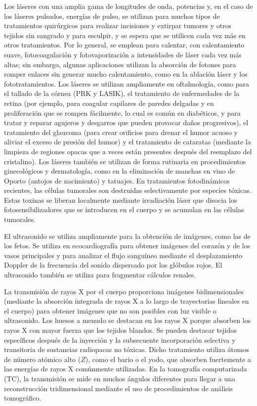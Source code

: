 \documentclass[12pt,a4paper]{book}
\begin{document}
Los láseres con una amplia gama de longitudes de onda, potencias y, en el caso de los láseres pulsados, energías de pulso, se utilizan para muchos tipos de tratamientos quirúrgicos para realizar incisiones y extirpar tumores y otros tejidos sin sangrado y para esculpir, y se espera que se utilicen cada vez más en otros tratamientos. Por lo general, se emplean para calentar, con calentamiento suave, fotocoagulación y fotovaporización a intensidades de láser cada vez más altas; sin embargo, algunas aplicaciones utilizan la absorción de fotones para romper enlaces sin generar mucho calentamiento, como en la ablación láser y los fototratamientos. Los láseres se utilizan ampliamente en oftalmología, como para el tallado de la córnea (PRK y LASIK), el tratamiento de enfermedades de la retina (por ejemplo, para coagular capilares de paredes delgadas y en proliferación que se rompen fácilmente, lo cual es común en diabéticos, y para tratar y reparar agujeros y desgarros que pueden provocar daños progresivos), el tratamiento del glaucoma (para crear orificios para drenar el humor acuoso y aliviar el exceso de presión del humor) y el tratamiento de cataratas (mediante la limpieza de regiones opacas que a veces están presentes después del reemplazo del cristalino). Los láseres también se utilizan de forma rutinaria en procedimientos ginecológicos y dermatología, como en la eliminación de manchas en vino de Oporto (antojos de nacimiento) y tatuajes. En tratamientos fotodinámicos recientes, las células tumorales son destruidas selectivamente por especies tóxicas. Estas toxinas se liberan localmente mediante irradiación láser que disocia los fotosensibilizadores que se introducen en el cuerpo y se acumulan en las células tumorales.

El ultrasonido se utiliza ampliamente para la obtención de imágenes, como las de los fetos. Se utiliza en ecocardiografía para obtener imágenes del corazón y de los vasos principales y para analizar el flujo sanguíneo mediante el desplazamiento Doppler de la frecuencia del sonido dispersado por los glóbulos rojos. El ultrasonido también se utiliza para fragmentar cálculos renales.

La transmisión de rayos X por el cuerpo proporciona imágenes bidimensionales (mediante la absorción integrada de rayos X a lo largo de trayectorias lineales en el cuerpo) para obtener imágenes que no son posibles con luz visible o ultrasonido. Los huesos a menudo se destacan en los rayos X porque absorben los rayos X con mayor fuerza que los tejidos blandos. Se pueden destacar tejidos específicos después de la inyección y la subsecuente incorporación selectiva y transitoria de sustancias radiopacas no tóxicas. Dicho tratamiento utiliza átomos de número atómico alto ($Z$), como el bario o el yodo, que absorben fuertemente a las energías de rayos X comúnmente utilizadas. En la tomografía computarizada (TC), la transmisión se mide en muchos ángulos diferentes para llegar a una reconstrucción tridimensional mediante el uso de procedimientos de análisis tomográfico.
\end{document}

